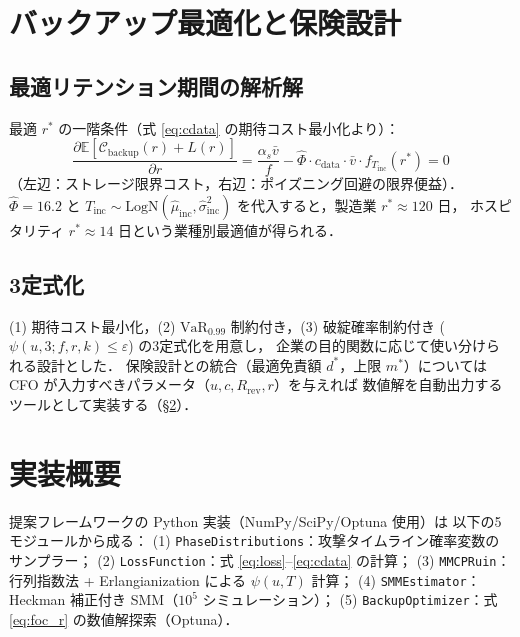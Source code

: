 \documentclass{ipsjlike}
\newcommand{\E}{\mathbb{E}}
\newcommand{\VaR}{\mathrm{VaR}}
\newcommand{\ruin}{\psi}
\begin{document}
\section{バックアップ最適化と保険設計}
\label{sec:optimal}

\subsection{最適リテンション期間の解析解}

最適 $r^*$ の一階条件（式 \eqref{eq:cdata} の期待コスト最小化より）：
\begin{equation}
  \frac{\partial \E[\mathcal{C}_{\mathrm{backup}}(r) + L(r)]}{\partial r}
  = \frac{\alpha_s \bar{v}}{f} - \hat{\Phi} \cdot c_{\mathrm{data}} \cdot \bar{v} \cdot f_{T_{\mathrm{inc}}}(r^*) = 0
  \label{eq:foc_r}
\end{equation}
（左辺：ストレージ限界コスト，右辺：ポイズニング回避の限界便益）．
$\hat{\Phi} = 16.2$ と $T_{\mathrm{inc}} \sim \mathrm{LogN}(\hat{\mu}_{\mathrm{inc}}, \hat{\sigma}_{\mathrm{inc}}^2)$
を代入すると，製造業 $r^* \approx 120$ 日，
ホスピタリティ $r^* \approx 14$ 日という業種別最適値が得られる．

\subsection{3定式化}

(1) 期待コスト最小化，(2) $\VaR_{0.99}$ 制約付き，(3) 破綻確率制約付き
($\ruin(u,3;f,r,k) \leq \varepsilon$) の3定式化を用意し，
企業の目的関数に応じて使い分けられる設計とした．
保険設計との統合（最適免責額 $d^*$，上限 $m^*$）については
CFO が入力すべきパラメータ（$u, c, R_{\mathrm{rev}}, r$）を与えれば
数値解を自動出力するツールとして実装する（§\ref{sec:impl}）．

\section{実装概要}
\label{sec:impl}

提案フレームワークの Python 実装（NumPy/SciPy/Optuna 使用）は
以下の5モジュールから成る：
(1) \texttt{PhaseDistributions}：攻撃タイムライン確率変数のサンプラー；
(2) \texttt{LossFunction}：式 \eqref{eq:loss}--\eqref{eq:cdata} の計算；
(3) \texttt{MMCPRuin}：行列指数法 + Erlangianization による $\ruin(u,T)$ 計算；
(4) \texttt{SMMEstimator}：Heckman 補正付き SMM（$10^5$ シミュレーション）；
(5) \texttt{BackupOptimizer}：式 \eqref{eq:foc_r} の数値解探索（Optuna）．
\end{document}
